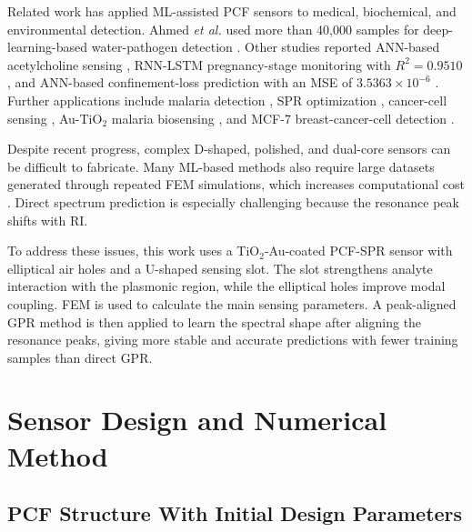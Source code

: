 \documentclass[ACS,STIX2COL]{WileyNJD-v2}
\begin{document}
Related work has applied ML-assisted PCF sensors to medical, biochemical, and environmental detection. Ahmed \textit{et al.} used more than 40,000 samples for deep-learning-based water-pathogen detection \cite{ahmed2025waterpathogen}. Other studies reported ANN-based acetylcholine sensing \cite{yadav2025enhanced}, RNN-LSTM pregnancy-stage monitoring with $R^2=0.9510$ \cite{ahmed2025pregnancy}, and ANN-based confinement-loss prediction with an MSE of $3.5363\times10^{-6}$ \cite{hamzaoui2025machine}. Further applications include malaria detection \cite{abdullah2026machine}, SPR optimization \cite{kaziz2024optimizing}, cancer-cell sensing \cite{bepare2026highly}, Au-TiO$_2$ malaria biosensing \cite{tayef2025highly}, and MCF-7 breast-cancer-cell detection \cite{jamil2025gold}.

Despite recent progress, complex D-shaped, polished, and dual-core sensors can be difficult to fabricate. Many ML-based methods also require large datasets generated through repeated FEM simulations, which increases computational cost \cite{md2026smart}. Direct spectrum prediction is especially challenging because the resonance peak shifts with RI.

To address these issues, this work uses a TiO$_2$-Au-coated PCF-SPR sensor with elliptical air holes and a U-shaped sensing slot. The slot strengthens analyte interaction with the plasmonic region, while the elliptical holes improve modal coupling. FEM is used to calculate the main sensing parameters. A peak-aligned GPR method is then applied to learn the spectral shape after aligning the resonance peaks, giving more stable and accurate predictions with fewer training samples than direct GPR.
\section{Sensor Design and Numerical Method}


\subsection{PCF Structure With Initial Design Parameters}
\end{document}
